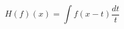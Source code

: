 \documentclass[final]{beamer}
\author{matematika.pl}
\institute{2015}
\begin{document}
\begin{frame}[t]

\begin{equation}
    H(f)(x) = \int f(x-t) \frac{dt}{t}
\end{equation}

\end{frame}
\end{document}
